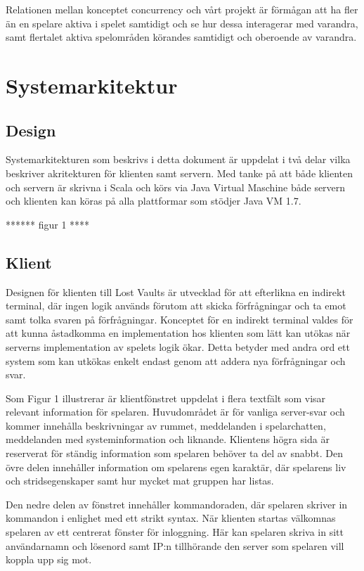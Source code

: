 \documentclass[a4paper]{article}
\begin{document}
Relationen mellan konceptet concurrency och vårt projekt är förmågan att ha fler än en spelare aktiva i spelet samtidigt och se hur dessa interagerar med varandra, samt flertalet 
aktiva spelområden körandes samtidigt och oberoende av varandra.

\section{Systemarkitektur}
\subsection{Design}
Systemarkitekturen som beskrivs i detta dokument är uppdelat i två delar vilka beskriver akritekturen för klienten samt servern. Med tanke på att både klienten och servern är skrivna i Scala och körs via Java Virtual Maschine både servern och klienten kan köras på alla plattformar som stödjer Java VM 1.7.


****** figur 1 ****




\subsection{Klient}
Designen för klienten till Lost Vaults är utvecklad för att efterlikna en indirekt terminal, där ingen logik används förutom att skicka förfrågningar och 
ta emot samt tolka svaren på förfrågningar. Konceptet för en indirekt terminal valdes för att kunna åstadkomma en implementation hos klienten som lätt kan utökas när serverns implementation av spelets logik ökar. Detta betyder med andra ord ett system som kan utkökas enkelt endast genom att addera nya förfrågningar och svar.

Som Figur 1 illustrerar är klientfönstret uppdelat i flera textfält som visar relevant information för spelaren. Huvudområdet är för vanliga server-svar och kommer innehålla beskrivningar 
av rummet, meddelanden i spelarchatten, meddelanden med systeminformation och liknande. Klientens högra sida är reserverat för ständig information som spelaren behöver ta del av snabbt. 
Den övre delen innehåller information om spelarens egen karaktär, där spelarens liv och stridsegenskaper samt hur mycket mat gruppen har listas. 

Den nedre delen av fönstret innehåller kommandoraden, där spelaren skriver in kommandon i enlighet med ett strikt syntax. När klienten startas välkomnas spelaren 
av ett centrerat fönster för inloggning. Här kan spelaren skriva in sitt användarnamn och lösenord samt IP:n tillhörande den server som spelaren vill koppla upp sig mot. 
\end{document}

